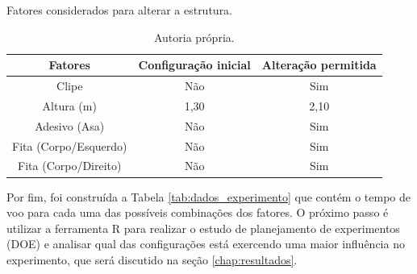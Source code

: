 \begin{table}[H]
  \caption{Fatores considerados para alterar a estrutura.}
  \centering
  \begin{tabular}{|c|c|c|}
  \hline
  \rowcolor[HTML]{EFEFEF} 
  \textbf{Fatores}      & \textbf{Configuração inicial} & \textbf{Alteração permitida} \\ \hline
  Clipe                 & Não                         & Sim                          \\ \hline
  \rowcolor[HTML]{EFEFEF} 
  Altura (m)            & 1,30                        & 2,10                         \\ \hline
  Adesivo (Asa)         & Não                         & Sim                          \\ \hline
  \rowcolor[HTML]{EFEFEF} 
  Fita (Corpo/Esquerdo) & Não                         & Sim                          \\ \hline
  Fita (Corpo/Direito)  & Não                         & Sim                          \\ \hline
  \end{tabular}
  \caption*{Autoria própria.}
  \label{tab:fatores}
  \end{table}

Por fim, foi construída a Tabela \ref{tab:dados_experimento} que contém o tempo de voo para cada uma das possíveis combinações dos fatores. O próximo passo é utilizar a ferramenta R para realizar o estudo de planejamento de experimentos (DOE) e analisar qual das configurações está exercendo uma maior influência no experimento, que será discutido na seção \ref{chap:resultados}.

